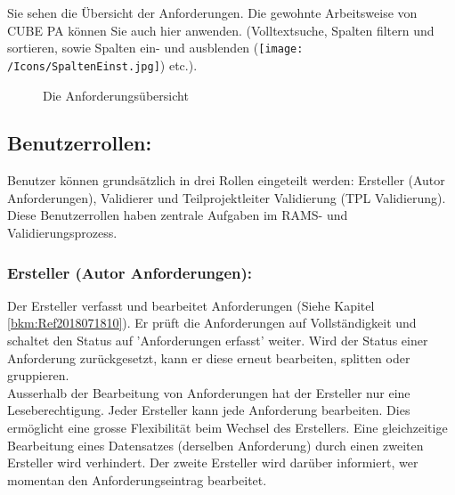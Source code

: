\vspace{10.5cm}

Sie sehen die Übersicht der Anforderungen. Die gewohnte Arbeitsweise von CUBE PA können Sie auch hier anwenden. (Volltextsuche, Spalten filtern und sortieren, sowie Spalten ein- und ausblenden (\texttt{[image: /Icons/SpaltenEinst.jpg]}) etc.).

\begin{figure}[H]
\caption{Die Anforderungsübersicht}
\end{figure}

\subsection{Benutzerrollen:} 
Benutzer können grundsätzlich in drei Rollen eingeteilt werden: Ersteller (Autor Anforderungen), Validierer und Teilprojektleiter Validierung (TPL Validierung). Diese Benutzerrollen haben zentrale Aufgaben im RAMS- und Validierungsprozess.

\subsubsection{Ersteller (Autor Anforderungen):} 
Der Ersteller verfasst und bearbeitet Anforderungen (Siehe Kapitel \ref{bkm:Ref2018071810}). Er prüft die Anforderungen auf Vollständigkeit und schaltet den Status auf 'Anforderungen erfasst' weiter. Wird der Status einer Anforderung zurückgesetzt, kann er diese erneut bearbeiten, splitten oder gruppieren. \\
Ausserhalb der Bearbeitung von Anforderungen hat der Ersteller nur eine Leseberechtigung. Jeder Ersteller kann jede Anforderung bearbeiten. Dies ermöglicht eine grosse Flexibilität beim Wechsel des Erstellers. Eine gleichzeitige Bearbeitung eines Datensatzes (derselben Anforderung) durch einen zweiten Ersteller wird verhindert. Der zweite Ersteller wird darüber informiert, wer momentan den Anforderungseintrag bearbeitet. 

